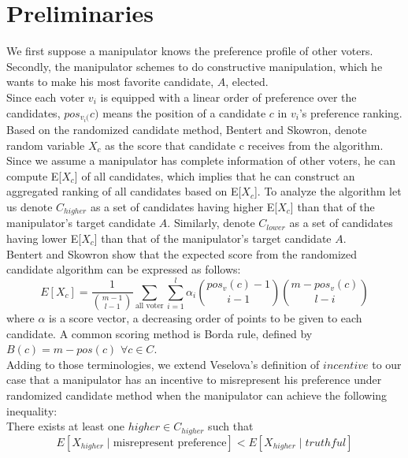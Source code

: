 \documentclass[letterpaper]{article} %
\begin{document}
\section{Preliminaries}
We first suppose a manipulator knows the preference profile of other voters. Secondly, the manipulator schemes to do constructive manipulation, which he wants to make his most favorite candidate, $A$, elected.\\
Since each voter $v_i$ is equipped with a linear order of preference over the candidates, $pos_{v_i(}c)$ means the position of a candidate $c$ in $v_i$’s preference ranking.\\
Based on the randomized candidate method, Bentert and Skowron, denote random variable $X_c$ as the score that candidate c receives from the algorithm. Since we assume a manipulator has complete information of other voters, he can compute E[$X_c$] of all candidates, which implies that he can construct an aggregated ranking of all candidates based on E[$X_c$]. To analyze the algorithm let us denote $C_{higher}$ as a set of candidates having higher E[$X_c$] than that of the manipulator’s target candidate $A$. Similarly, denote $C_{lower}$  as a set of candidates having lower E[$X_c$] than that of the manipulator’s target candidate $A$.%
\\Bentert and Skowron show that the expected score from the randomized candidate algorithm can be expressed as follows: \\ 
\begin{equation} 
E[X_c] = \frac{1}{\binom{m-1}{l-1}}\sum_{\text{all voter}} \sum_{i=1}^l \alpha_i \binom{pos_v(c)-1}{i-1}\binom{m-pos_v(c)}{l-i} 
\end{equation}
where $\alpha$ is a score vector, a decreasing order of points to be given to each candidate. A common scoring method is Borda rule, defined by $B(c) = m - pos(c)$ $\forall c \in C$. \\
Adding to those terminologies, we extend Veselova's definition of $incentive$ to our case that a manipulator has an incentive to misrepresent his preference under randomized candidate method when the manipulator can achieve the following inequality: \\
There exists at least one $higher \in C_{higher}$ such that
\begin{equation}
E[X_{higher} \mid \text{misrepresent preference}] < E[X_{higher} \mid truthful]\nonumber
\end{equation}
\end{document}
